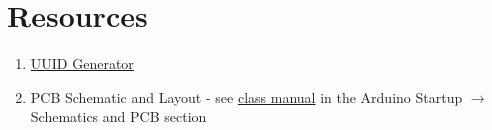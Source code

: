 \section{Resources}\label{sec:wirelessresources}
\begin{enumerate}
    \item \href{https://www.uuidgenerator.net/}{UUID Generator} 
    \item PCB Schematic and Layout - see 
            \href{https://github.com/semcneil/Fundamentals-of-Microcontrollers-Manual}{class manual} 
            in the Arduino Startup $\rightarrow$ Schematics and PCB section
\end{enumerate}

